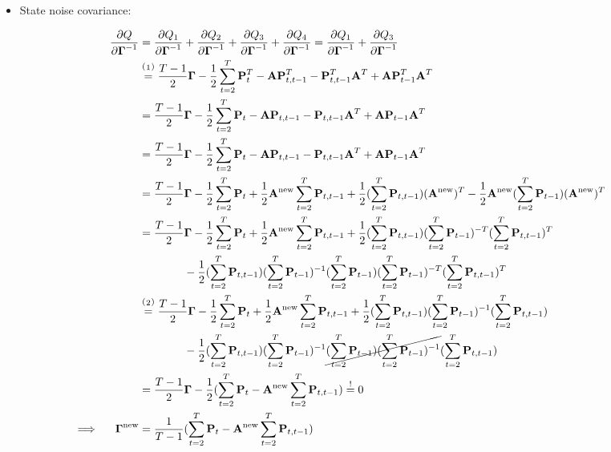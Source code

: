 		\begin{itemize}
			\item State noise covariance:
		\end{itemize}
		\begin{align*}
			&& \pdv{Q}{\mat{\Gamma}^{-1}}
				&= \pdv{Q_1}{\mat{\Gamma}^{-1}} + \pdv{Q_2}{\mat{\Gamma}^{-1}} + \pdv{Q_3}{\mat{\Gamma}^{-1}} + \pdv{Q_4}{\mat{\Gamma}^{-1}} = \pdv{Q_1}{\mat{\Gamma}^{-1}} + \pdv{Q_3}{\mat{\Gamma}^{-1}} & \\
			&&	&\oversetfootnotemark{=} \frac{T - 1}{2} \mat{\Gamma} - \frac{1}{2} \sum_{t = 2}^{T} \mat{P}_t^T - \mat{A} \mat{P}_{t, t - 1}^T - \mat{P}_{t, t - 1}^T \mat{A}^T + \mat{A} \mat{P}_{t - 1}^T \mat{A}^T & \\
			&&	&= \frac{T - 1}{2} \mat{\Gamma} - \frac{1}{2} \sum_{t = 2}^{T} \mat{P}_t - \mat{A} \mat{P}_{t, t - 1} - \mat{P}_{t, t - 1} \mat{A}^T + \mat{A} \mat{P}_{t - 1} \mat{A}^T & \\
			&&	&= \frac{T - 1}{2} \mat{\Gamma} - \frac{1}{2} \sum_{t = 2}^{T} \mat{P}_t - \mat{A} \mat{P}_{t, t - 1} - \mat{P}_{t, t - 1} \mat{A}^T + \mat{A} \mat{P}_{t - 1} \mat{A}^T & \\
			&&	&= \frac{T - 1}{2} \mat{\Gamma} - \frac{1}{2} \sum_{t = 2}^{T} \mat{P}_t + \frac{1}{2} \mat{A}^\new \sum_{t = 2}^{T} \mat{P}_{t, t - 1} + \frac{1}{2} \paren{\sum_{t = 2}^{T} \mat{P}_{t, t - 1}} \paren{\mat{A}^\new}^T - \frac{1}{2} \mat{A}^\new \paren{\sum_{t = 2}^{T} \mat{P}_{t - 1}} \paren{\mat{A}^\new}^T & \\
			&&	&= \frac{T - 1}{2} \mat{\Gamma} - \frac{1}{2} \sum_{t = 2}^{T} \mat{P}_t + \frac{1}{2} \mat{A}^\new \sum_{t = 2}^{T} \mat{P}_{t, t - 1} + \frac{1}{2} \paren{\sum_{t = 2}^{T} \mat{P}_{t, t - 1}} \paren{\sum_{t = 2}^{T} \mat{P}_{t - 1}}^{-T} \paren{\sum_{t = 2}^{T} \mat{P}_{t, t - 1}}^T & \\
			&&	&\qquad\qquad - \frac{1}{2} \paren{\sum_{t = 2}^{T} \mat{P}_{t, t - 1}} \paren{\sum_{t = 2}^{T} \mat{P}_{t - 1}}^{-1} \paren{\sum_{t = 2}^{T} \mat{P}_{t - 1}} \paren{\sum_{t = 2}^{T} \mat{P}_{t - 1}}^{-T} \paren{\sum_{t = 2}^{T} \mat{P}_{t, t - 1}}^T & \\
			&&	&\oversetfootnotemark{=} \frac{T - 1}{2} \mat{\Gamma} - \frac{1}{2} \sum_{t = 2}^{T} \mat{P}_t + \frac{1}{2} \mat{A}^\new \sum_{t = 2}^{T} \mat{P}_{t, t - 1} + \frac{1}{2} \paren{\sum_{t = 2}^{T} \mat{P}_{t, t - 1}} \paren{\sum_{t = 2}^{T} \mat{P}_{t - 1}}^{-1} \paren{\sum_{t = 2}^{T} \mat{P}_{t, t - 1}} & \\
			&&	&\qquad\qquad - \frac{1}{2} \paren{\sum_{t = 2}^{T} \mat{P}_{t, t - 1}} \paren{\sum_{t = 2}^{T} \mat{P}_{t - 1}}^{-1} \cancel{\paren{\sum_{t = 2}^{T} \mat{P}_{t - 1}} \paren{\sum_{t = 2}^{T} \mat{P}_{t - 1}}^{-1}} \paren{\sum_{t = 2}^{T} \mat{P}_{t, t - 1}} & \\
			&&	&= \frac{T - 1}{2} \mat{\Gamma} - \frac{1}{2} \paren{ \sum_{t = 2}^{T} \mat{P}_t - \mat{A}^\new \sum_{t = 2}^{T} \mat{P}_{t, t - 1} } \overset{!}{=} 0 & \\
			\implies && \mat{\Gamma}^\new &= \frac{1}{T - 1} \paren{ \sum_{t = 2}^{T} \mat{P}_t - \mat{A}^\new \sum_{t = 2}^{T} \mat{P}_{t, t - 1} } &
		\end{align*}
